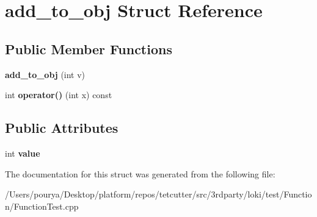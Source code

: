 \hypertarget{structadd__to__obj}{}\section{add\+\_\+to\+\_\+obj Struct Reference}
\label{structadd__to__obj}
\subsection*{Public Member Functions}
\begin{DoxyCompactItemize}
\item 
\hypertarget{structadd__to__obj_a941d3cc6ec24804120cbf08fac2663be}{}{\bfseries add\+\_\+to\+\_\+obj} (int v)\label{structadd__to__obj_a941d3cc6ec24804120cbf08fac2663be}

\item 
\hypertarget{structadd__to__obj_ae6e0757ea922bf2a51c56402ffb580f4}{}int {\bfseries operator()} (int x) const \label{structadd__to__obj_ae6e0757ea922bf2a51c56402ffb580f4}

\end{DoxyCompactItemize}
\subsection*{Public Attributes}
\begin{DoxyCompactItemize}
\item 
\hypertarget{structadd__to__obj_af30816712ceb04a433966152cb0116a8}{}int {\bfseries value}\label{structadd__to__obj_af30816712ceb04a433966152cb0116a8}

\end{DoxyCompactItemize}


The documentation for this struct was generated from the following file\+:\begin{DoxyCompactItemize}
\item 
/\+Users/pourya/\+Desktop/platform/repos/tetcutter/src/3rdparty/loki/test/\+Function/Function\+Test.\+cpp\end{DoxyCompactItemize}
